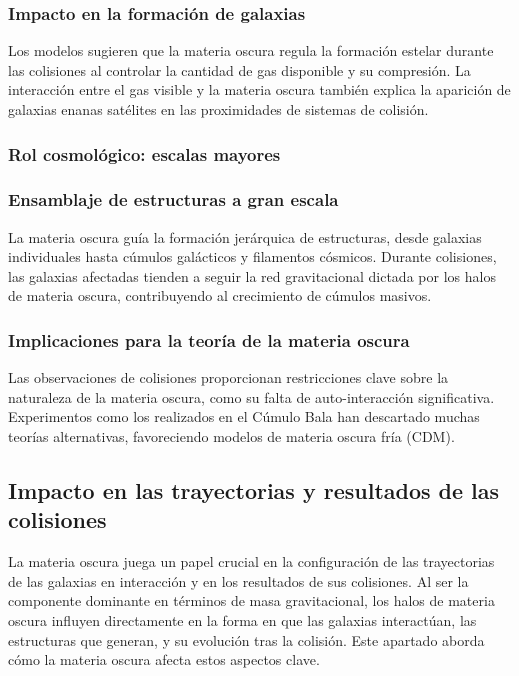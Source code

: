 \documentclass{article}
\begin{document}
\subsubsection*{Impacto en la formación de galaxias}

Los modelos sugieren que la materia oscura regula la formación estelar durante las colisiones al controlar la cantidad de gas disponible y su compresión. La interacción entre el gas visible y la materia oscura también explica la aparición de galaxias enanas satélites en las proximidades de sistemas de colisión.
\subsubsection{Rol cosmológico: escalas mayores}
\subsubsection*{Ensamblaje de estructuras a gran escala}

La materia oscura guía la formación jerárquica de estructuras, desde galaxias individuales hasta cúmulos galácticos y filamentos cósmicos. Durante colisiones, las galaxias afectadas tienden a seguir la red gravitacional dictada por los halos de materia oscura, contribuyendo al crecimiento de cúmulos masivos.
\subsubsection*{Implicaciones para la teoría de la materia oscura}

Las observaciones de colisiones proporcionan restricciones clave sobre la naturaleza de la materia oscura, como su falta de auto-interacción significativa. Experimentos como los realizados en el Cúmulo Bala han descartado muchas teorías alternativas, favoreciendo modelos de materia oscura fría (CDM).

\subsection{Impacto en las trayectorias y resultados de las colisiones}
La materia oscura juega un papel crucial en la configuración de las trayectorias de las galaxias en interacción y en los resultados de sus colisiones. Al ser la componente dominante en términos de masa gravitacional, los halos de materia oscura influyen directamente en la forma en que las galaxias interactúan, las estructuras que generan, y su evolución tras la colisión. Este apartado aborda cómo la materia oscura afecta estos aspectos clave.
\end{document}
